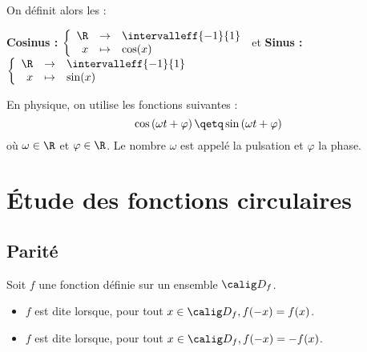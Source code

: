 \documentclass[10pt,openright,twoside,french]{book}
\begin{document}
\begin{Defi}
    On définit alors les  :\par\medskip
        \textbf{Cosinus :} $\left\{\begin{array}{rcl}
                                                \R & \to & \intervalleff{-1}{1} \\
                                                x & \mapsto & \cos(x)
                                            \end{array}\right.$ \qquad et \qquad
        \textbf{Sinus :} $\left\{\begin{array}{rcl}
                                                \R & \to & \intervalleff{-1}{1} \\
                                                x & \mapsto & \sin(x)
                                            \end{array}\right.$
\end{Defi}

\begin{Exemple}
    En physique, on utilise les fonctions suivantes :
    \[\cos\left(\omega t + \varphi\right) \qetq \sin\left(\omega t + \varphi\right)\] où $\omega \in \R$ et $\varphi \in \R$.
    Le nombre $\omega$ est appelé la pulsation et $\varphi$ la phase.
\end{Exemple}

\section{\'Etude des fonctions circulaires}
\subsection{Parité}

\begin{Defi}
    Soit $f$ une fonction définie sur un ensemble $\calig D_f$.\par
    \begin{itemize}
        \item $f$ est dite  lorsque, pour tout $x \in \calig D_f, f(-x) = f(x)$.
        \item $f$ est dite  lorsque, pour tout $x \in \calig D_f, f(-x) = -f(x)$.
    \end{itemize}
\end{Defi}
\end{document}
